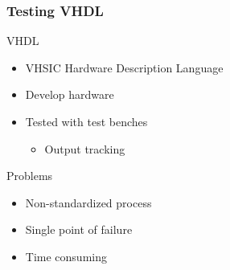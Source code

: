 \documentclass[british,10pt]{beamer}
\begin{document}
\begin{frame}\frametitle{Testing VHDL}
VHDL
\begin{itemize}
\item VHSIC Hardware Description Language
\item Develop hardware
\item Tested with test benches
\begin{itemize}
\item Output tracking
\end{itemize}
\end{itemize}
\vskip5pt
Problems
\begin{itemize}
\item Non-standardized process
\item Single point of failure
\item Time consuming
\end{itemize}
\end{frame}
\end{document}
